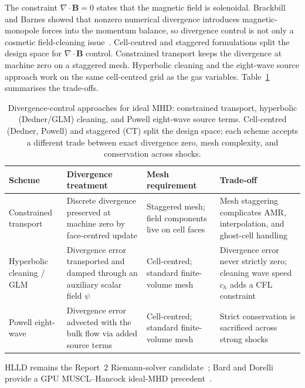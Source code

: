 The constraint \(\nabla\cdot\mathbf{B}=0\) states that the magnetic field is
solenoidal. Brackbill and Barnes showed that nonzero numerical divergence
introduces magnetic-monopole forces into the momentum balance, so divergence
control is not only a cosmetic field-cleaning issue~\citep{brackbill_barnes_1980}.
Cell-centred and staggered formulations split the design space for $\nabla \cdot \mathbf{B}$ control. Constrained transport keeps the divergence at machine zero on a staggered mesh. Hyperbolic cleaning and the eight-wave source approach work on the same cell-centred grid as the gas variables. Table~\ref{tab:ch2-divB-comparison} summarises the trade-offs.

\begin{table}[htbp]
\centering
\small
\begin{tabularx}{\textwidth}{@{}l>{\raggedright\arraybackslash}X>{\raggedright\arraybackslash}X>{\raggedright\arraybackslash}X@{}}
\toprule
Scheme & Divergence treatment & Mesh requirement & Trade-off \\
\midrule
Constrained transport \citep{evans_hawley_1988} & Discrete divergence preserved at machine zero by face-centred update & Staggered mesh; field components live on cell faces & Mesh staggering complicates AMR, interpolation, and ghost-cell handling \\ \addlinespace
Hyperbolic cleaning / GLM \citep{dedner_2002} & Divergence error transported and damped through an auxiliary scalar field $\psi$ & Cell-centred; standard finite-volume mesh & Divergence error never strictly zero; cleaning wave speed $c_h$ adds a CFL constraint \\ \addlinespace
Powell eight-wave \citep{powell_1999,toth_2000} & Divergence error advected with the bulk flow via added source terms & Cell-centred; standard finite-volume mesh & Strict conservation is sacrificed across strong shocks \\
\bottomrule
\end{tabularx}
\caption[Divergence-control approaches for ideal MHD]{Divergence-control approaches for ideal MHD: constrained transport, hyperbolic (Dedner/GLM) cleaning, and Powell eight-wave source terms. Cell-centred (Dedner, Powell) and staggered (CT) split the design space; each scheme accepts a different trade between exact divergence zero, mesh complexity, and conservation across shocks.}
\label{tab:ch2-divB-comparison}
\end{table}
HLLD remains the Report~2 Riemann-solver candidate~\citep{miyoshi_kusano_2005}; Bard and Dorelli provide a GPU MUSCL--Hancock ideal-MHD precedent~\citep{bard_dorelli_2014}.


